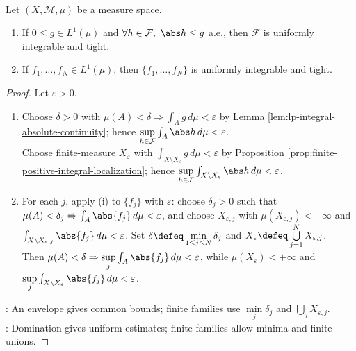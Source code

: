 \begin{proposition} \label{prop:l1-uniform-integrability-basic-sources} \\
Let $(X,\mathcal{M},\mu)$ be a measure space.
\begin{enumerate}[label=(\roman*)]
\setlength{\itemsep}{0pt}
\item If $0\leq g\in L^1(\mu)$ and $\forall h\in\mathcal{F},\ \abs h\leq g$ a.e., then $\mathcal{F}$ is uniformly integrable and tight.
\item If $f_1,\ldots,f_N\in L^1(\mu)$, then $\{f_1,\ldots,f_N\}$ is uniformly integrable and tight.
\end{enumerate}
\begin{proof} Let $\varepsilon>0$.
\begin{enumerate}[label=(\roman*)]
\setlength{\itemsep}{0pt}
\item Choose $\delta>0$ with $\mu(A)<\delta\Rightarrow\int_Ag\,d\mu<\varepsilon$ by Lemma \ref{lem:lp-integral-absolute-continuity}; hence $\sup\limits_{h\in\mathcal F}\int_A\abs h\,d\mu<\varepsilon$.\\
Choose finite-measure $X_\varepsilon$ with $\int_{X\setminus X_\varepsilon}g\,d\mu<\varepsilon$ by Proposition \ref{prop:finite-positive-integral-localization}; hence $\sup\limits_{h\in\mathcal F}\int_{X\setminus X_\varepsilon}\abs h\,d\mu<\varepsilon$.
\item For each $j$, apply (i) to $\{f_j\}$ with $\varepsilon$: choose $\delta_j>0$ such that $\mu(A)<\delta_j\Rightarrow\int_A\abs{f_j}\,d\mu<\varepsilon$, and choose $X_{\varepsilon,j}$ with $\mu(X_{\varepsilon,j})<+\infty$ and $\int_{X\setminus X_{\varepsilon,j}}\abs{f_j}\,d\mu<\varepsilon$. Set $\delta\defeq\min\limits_{1\leq j\leq N}\delta_j$ and $X_\varepsilon\defeq\bigcup\limits_{j=1}^NX_{\varepsilon,j}$.\\
Then $\mu(A)<\delta\Rightarrow\sup\limits_j\int_A\abs{f_j}\,d\mu<\varepsilon$, while $\mu(X_\varepsilon)<+\infty$ and $\sup\limits_j\int_{X\setminus X_\varepsilon}\abs{f_j}\,d\mu<\varepsilon$.
\end{enumerate}
: An envelope gives common bounds; finite families use $\min\limits_j\delta_j$ and $\bigcup\limits_jX_{\varepsilon,j}$.\\
: Domination gives uniform estimates; finite families allow minima and finite unions.
\end{proof}
\end{proposition}

